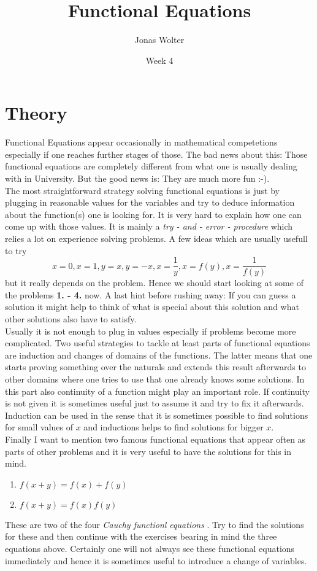 \documentclass[11pt,a5paper]{article}
\title{\textbf{Functional Equations}}
\date{Week 4}
\author{Jonas Wolter}
\begin{document}
\maketitle

\section{Theory}
Functional Equations appear occasionally in mathematical competetions especially if one reaches further stages of those. The bad news about this: Those functional equations are completely different from what one is usually dealing with in University. But the good news is: They are much more fun :-).\\
\noindent The most straightforward strategy solving functional equations is just by plugging in reasonable values for the variables and try to deduce information about the function(s) one is looking for. It is very hard to explain how one can come up with those values. It is mainly a \emph{try - and - error - procedure} which relies a lot on experience solving problems. A few ideas which are usually usefull to try
\[x=0, x=1, y=x, y=-x, x=\frac{1}{y}, x=f(y), x=\frac{1}{f(y)}\]
 but it really depends on the problem. Hence we should start looking at some of the problems \textbf{1. - 4.}  now. A last hint before rushing away: If you can guess a solution it might help to think of what is special about this solution and what other solutions also have to satisfy.\\

\noindent Usually it is not enough to plug in values especially if problems become more complicated. Two useful strategies to tackle at least parts of functional equations are induction and changes of domains of the functions. The latter means that one starts proving something over the naturals and extends this result afterwards to other domains where one tries to use that one already knows some solutions. In this part also continuity of a function might play an important role. If continuity is not given it is sometimes useful just to assume it and try to fix it afterwards. Induction can be used in the sense that it is sometimes possible to find solutions for small values of $x$ and inductions helps to find solutions for bigger $x$. \\
Finally I want to mention two famous functional equations that appear often as parts of other problems and it is very useful to have the solutions for this in mind. 
\begin{enumerate}
\item{$f(x+y)=f(x)+f(y)$}
\item{$f(x+y) = f(x)f(y)$}
\end{enumerate}
These are two of the four \emph{Cauchy functionl equations} . Try to find the solutions for these and then continue with the exercises bearing in mind the three equations above. Certainly one will not always see these functional equations immediately and hence it is sometimes useful to introduce a change of variables.
\end{document}

